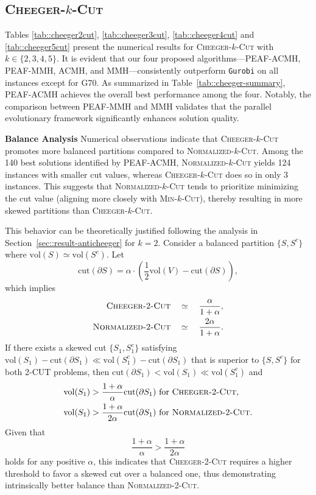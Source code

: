 \documentclass[12pt, a4paper]{article}%
\newcommand{\cut}{\mathrm{cut}}
\newcommand{\vol}{\mathrm{vol}}
\numberwithin{equation}{section}
\theoremstyle{plain}
\begin{document}
			
			\subsection{\textsc{Cheeger}-$k$-\textsc{Cut}}
			\label{sec::cheeger-k-cut}
			
			Tables \ref{tab::cheeger2cut}, \ref{tab::cheeger3cut}, \ref{tab::cheeger4cut} and \ref{tab::cheeger5cut} present the numerical results for \textsc{Cheeger}-$k$-\textsc{Cut} with $k \in \{2, 3, 4, 5\}$. It is evident that our four proposed algorithms---PEAF-ACMH, PEAF-MMH, ACMH, and MMH---consistently outperform \texttt{Gurobi} on all instances except for G70. As summarized in Table~\ref{tab::cheeger-summary}, PEAF-ACMH achieves the overall best performance among the four. Notably, the comparison between PEAF-MMH and MMH validates that the parallel evolutionary framework significantly enhances solution quality.
			
			\textbf{Balance Analysis} 
			Numerical observations indicate that \textsc{Cheeger}-$k$-\textsc{Cut} promotes more balanced partitions compared to \textsc{Normalized}-$k$-\textsc{Cut}. Among the 140 best solutions identified by PEAF-ACMH, \textsc{Normalized}-$k$-\textsc{Cut} yields 124 instances with smaller cut values, whereas \textsc{Cheeger}-$k$-\textsc{Cut} does so in only 3 instances. This suggests that \textsc{Normalized}-$k$-\textsc{Cut} tends to prioritize minimizing the cut value (aligning more closely with \textsc{Min}-$k$-\textsc{Cut}), thereby resulting in more skewed partitions than \textsc{Cheeger}-$k$-\textsc{Cut}.
			
			This behavior can be theoretically justified following the analysis in Section~\ref{sec::result-anticheeger} for $k=2$. Consider a balanced partition $\{S, S^c\}$ where $\vol(S) \simeq \vol(S^c)$. Let $$\cut(\partial S)=\alpha\cdot\left(\frac{1}{2}\vol(V)-\cut(\partial S)\right),$$ which implies 	\begin{align*}
				\textsc{Cheeger-}2\textsc{-Cut}\quad&\simeq\quad \frac{\alpha}{1+\alpha}, \\
				\textsc{Normalized-}2\textsc{-Cut}\quad&\simeq\quad \frac{2\alpha}{1+\alpha}.
			\end{align*} If there exists a skewed cut $\{S_1, S_1^c\}$ satisfying $\vol(S_1) - \cut(\partial S_1) \ll \vol(S_1^c) - \cut(\partial S_1)$ that is superior to $\{S, S^c\}$ for both 2-CUT problems, then $\cut(\partial S_1) < \vol(S_1) \ll \vol(S_1^c)$ and \begin{align*}
			\vol(S_1)&>\frac{1+\alpha}{\alpha}\cut(\partial S_1) \text{ for }\textsc{Cheeger-}2\textsc{-Cut},\\ 
			\vol(S_1)&>\frac{1+\alpha}{2\alpha}\cut(\partial S_1) \text{ for }\textsc{Normalized-}2\textsc{-Cut}. \\
			\end{align*} Given that$$
			\frac{1+\alpha}{\alpha}  > \frac{1+\alpha}{2\alpha}
			$$ holds for any positive $\alpha$, this indicates that \textsc{Cheeger}-2-\textsc{Cut} requires a higher threshold to favor a skewed cut over a balanced one, thus demonstrating intrinsically better balance than \textsc{Normalized}-2-\textsc{Cut}.
			
\end{document}
